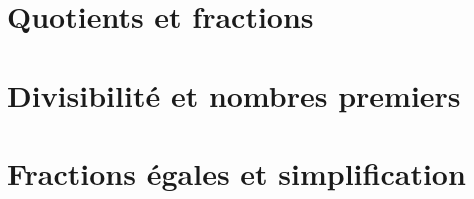 \documentclass[12pt,a4paper]{article}
\date{}
\title{}
\begin{document}







\section{Quotients et fractions}



\newpage
\section{Divisibilité et nombres premiers}



\section{Fractions égales et simplification}


\end{document}
